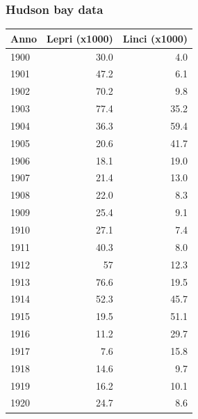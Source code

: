 \documentclass{beamer}
\begin{document}
\begin{frame}
\frametitle{Hudson bay data}

\begin{block}{}


{\footnotesize
\begin{tabular}{lrr}
\hline
\multicolumn{1}{c}{ Anno } & \multicolumn{1}{c}{ Lepri (x1000) } & \multicolumn{1}{c}{ Linci (x1000) } \\
\hline
1900 & 30.0          & 4.0           \\
1901 & 47.2          & 6.1           \\
1902 & 70.2          & 9.8           \\
1903 & 77.4          & 35.2          \\
1904 & 36.3          & 59.4          \\
1905 & 20.6          & 41.7          \\
1906 & 18.1          & 19.0          \\
1907 & 21.4          & 13.0          \\
1908 & 22.0          & 8.3           \\
1909 & 25.4          & 9.1           \\
1910 & 27.1          & 7.4           \\
1911 & 40.3          & 8.0           \\
1912 & 57            & 12.3          \\
1913 & 76.6          & 19.5          \\
1914 & 52.3          & 45.7          \\
1915 & 19.5          & 51.1          \\
1916 & 11.2          & 29.7          \\
1917 & 7.6           & 15.8          \\
1918 & 14.6          & 9.7           \\
1919 & 16.2          & 10.1          \\
1920 & 24.7          & 8.6           \\
\hline
\end{tabular}
}

\noindent
\end{block}
\end{frame}
\end{document}
